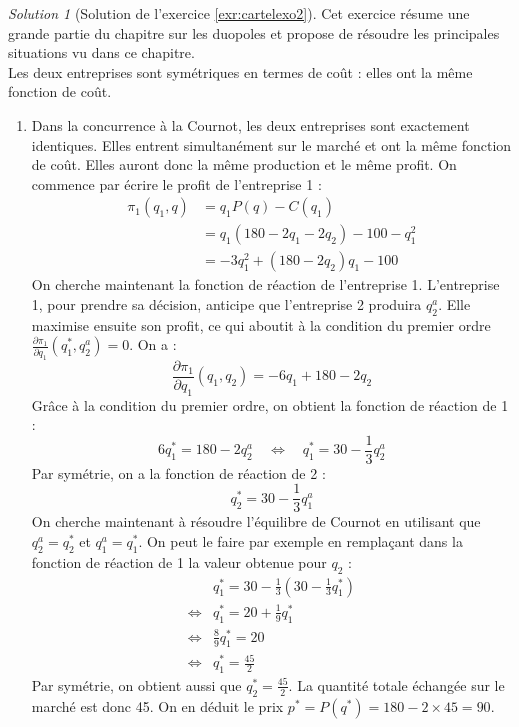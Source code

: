 \documentclass[
]{book}
\providecommand{\tightlist}{%
  \setlength{\itemsep}{0pt}\setlength{\parskip}{0pt}}
\theoremstyle{definition}
\theoremstyle{definition}
\theoremstyle{definition}
\theoremstyle{definition}
\theoremstyle{remark}
\newtheorem*{solution}{Solution}
\begin{document}
\begin{solution}[Solution de l'exercice \ref{exr:cartelexo2}]

Cet exercice résume une grande partie du chapitre sur les duopoles et propose de résoudre les principales situations vu dans ce chapitre.\\
Les deux entreprises sont symétriques en termes de coût : elles ont la même fonction de coût.

\begin{enumerate}
\def\labelenumi{\arabic{enumi}.}
\tightlist
\item
  Dans la concurrence à la Cournot, les deux entreprises sont exactement identiques.
  Elles entrent simultanément sur le marché et ont la même fonction de coût.
  Elles auront donc la même production et le même profit.
  On commence par écrire le profit de l'entreprise 1 :
  \begin{align*}
  \pi_1(q_1, q)&=q_1P(q)-C(q_1)\\
  &=q_1(180-2q_1-2q_2)-100-q_1^2\\
  &=-3q_1^2+(180-2q_2)q_1-100
  \end{align*}
  On cherche maintenant la fonction de réaction de l'entreprise 1.
  L'entreprise 1, pour prendre sa décision, anticipe que l'entreprise 2 produira \(q_2^a\).
  Elle maximise ensuite son profit, ce qui aboutit à la condition du premier ordre \(\frac{\partial\pi_1}{\partial q_1}(q_1^*, q_2^a)=0\).
  On a :
  \[\frac{\partial\pi_1}{\partial q_1}(q_1, q_2)=-6q_1+180-2q_2\]
  Grâce à la condition du premier ordre, on obtient la fonction de réaction de 1 :
  \[6q_1^*=180-2q_2^a\quad \Leftrightarrow \quad q_1^*=30-\frac{1}{3}q_2^a\]
  Par symétrie, on a la fonction de réaction de 2 :
  \[ q_2^*=30-\frac{1}{3}q_1^a\]
  On cherche maintenant à résoudre l'équilibre de Cournot en utilisant que \(q_2^a=q_2^*\) et \(q_1^a=q_1^*\).
  On peut le faire par exemple en remplaçant dans la fonction de réaction de 1 la valeur obtenue pour \(q_2\) :
  \begin{align*}
  &q_1^*=30-\frac{1}{3}\left(30-\frac{1}{3}q_1^*\right)\\
  \Leftrightarrow & q_1^*=20+ \frac{1}{9}q_1^* \\
  \Leftrightarrow & \frac{8}{9}q_1^*=20\\
  \Leftrightarrow & q_1^*=\frac{45}{2}
  \end{align*}
  Par symétrie, on obtient aussi que \(q^*_2=\frac{45}{2}\).
  La quantité totale échangée sur le marché est donc 45.
  On en déduit le prix \(p^*=P(q^*)=180-2\times45=90\).

\end{enumerate}
\end{solution}
\end{document}
